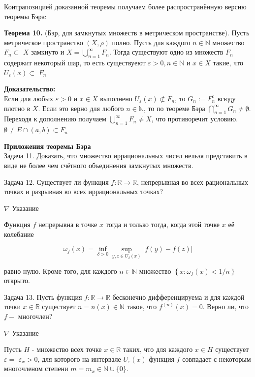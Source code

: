 \documentclass[a4paper,12pt]{article} %
\begin{document}
Контрапозицией доказанной теоремы получаем более распространённую версию теоремы Бэра:

\textbf{Теорема 10.} (Бэр, для замкнутых множеств в метрическом пространстве). Пусть метрическое пространство $(X, \rho)$ полно. Пусть для каждого $n \in \mathbb{N}$ множество $F_{n} \subset$ $X$ замкнуто и $X=\bigcup_{n=1}^{\infty} F_{n}$. Тогда существуют одно из множеств $F_{n}$ содержит некоторый шар, то есть существуеют $\varepsilon>0, n \in \mathbb{N}$ и $x \in X$ такие, что $U_{\varepsilon}(x) \subset$ $F_{n}$

\textbf{Доказательство:\\}
Если для любых $\varepsilon>0$ и $x \in X$ выполнено $U_{\varepsilon}(x) \not \subset F_{n}$, то $G_{n}:=F_{n}^{c}$ всюду плотно в $X$. Если это верно для любого $n \in \mathbb{N}$, то по теореме Бэра $\bigcap_{n=1}^{\infty} G_{n} \neq \emptyset$. Переходя к дополнению получаем $\bigcup_{n=1}^{\infty} F_{n} \neq X$, что противоречит условию.
$\emptyset \neq E \cap(a, b) \subset F_{n}$

\textbf{Приложения теоремы Бэра}\\
Задача 11. Доказать, что множество иррациональных чисел нельзя представить в виде не более чем счётного объединения замкнутых множеств.

Задача 12. Существует ли функция $f: \mathbb{R} \rightarrow \mathbb{R}$, непрерывная во всех рациональных точках и разрывная во всех иррациональных точках?

$\nabla$ Указание

Функция $f$ непрерывна в точке $x$ тогда и только тогда, когда этой точке $x$ её колебание

$$
\omega_{f}(x)=\inf _{\delta>0} \sup _{y, z \in U_{\delta}(x)}|f(y)-f(z)|
$$

равно нулю. Кроме того, для каждого $n \in \mathbb{N}$ множество $\left\{x: \omega_{f}(x)<1 / n\right\}$ открыто.

Задача 13. Пусть функция $f: \mathbb{R} \rightarrow \mathbb{R}$ бесконечно дифференцируема и для каждой точки $x \in \mathbb{R}$ существует $n=n(x) \in \mathbb{N}$ такое, что $f^{(n)}(x)=0$. Верно ли, что $f-$ многочлен?

$\nabla$ Указание

Пусть $H$ - множество всех точке $x \in \mathbb{R}$ таких, что для каждого $x \in H$ существует $\varepsilon=$ $\varepsilon_{x}>0$, для которого на интервале $U_{\varepsilon}(x)$ функция $f$ совпадает с некоторым многочленом степени $m=m_{x} \in \mathbb{N} \cup\{0\}$.
\end{document}
